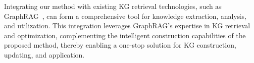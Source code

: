 Integrating our method with existing KG retrieval technologies, such as GraphRAG~\cite{GraphRAG}, can form a comprehensive tool for knowledge extraction, analysis, and utilization. 
This integration leverages GraphRAG's expertise in KG retrieval and optimization, complementing the intelligent construction capabilities of the proposed method, thereby enabling a one-stop solution for KG construction, updating, and application.